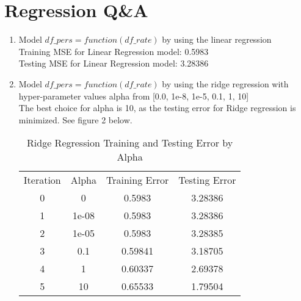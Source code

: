 \documentclass[12pt,twoside]{article}
\begin{document}
\section{Regression Q\&A}
\begin{enumerate}
    \item Model $df\_pers = function(df\_rate)$ by using the linear regression \\
    Training MSE for Linear Regression model: 0.5983\\
    Testing MSE for Linear Regression model: 3.28386
 
    \item Model $df\_pers = function(df\_rate)$ by using the ridge regression with hyper-parameter values alpha from [0.0, 1e-8, 1e-5, 0.1, 1, 10]\\
    The best choice for alpha is 10, as the testing error for Ridge regression is minimized. See figure 2 below.\\
    
       \begin{table}[h!]
        \centering
        \begin{tabular}{c|c|c|c}
                Iteration &  Alpha &  Training Error & Testing Error\\
                0 & 0 & 0.5983 & 3.28386\\
                1 & 1e-08 & 0.5983 & 3.28386\\
                2 & 1e-05 & 0.5983 & 3.28385\\
                3 & 0.1 & 0.59841 & 3.18705\\
                4 & 1 & 0.60337 & 2.69378\\
                5 & 10 & 0.65533 & 1.79504\\
        \end{tabular}
        \caption{Ridge Regression Training and Testing Error by Alpha}
        \label{tab:my_label}
    \end{table} 
 


\end{enumerate}
\end{document}
